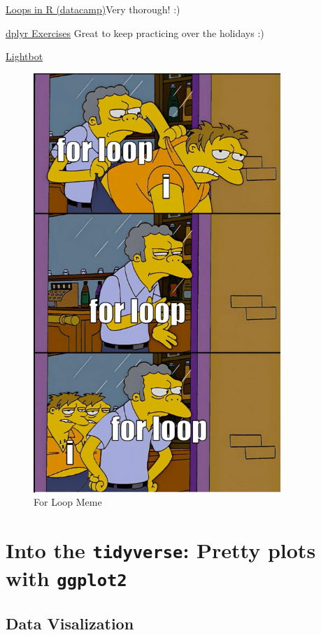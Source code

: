 \documentclass[
]{book}
\begin{document}
\href{https://www.datacamp.com/tutorial/tutorial-on-loops-in-r}{Loops in R (datacamp)}Very thorough! :)

\href{https://sjspielman.github.io/datascience_for_biologists/exercises/dplyr.html}{dplyr Exercises} Great to keep practicing over the holidays :)

\href{https://lightbot.com/hour-of-code.html}{Lightbot}

\begin{figure}
\centering
\includegraphics[width=\textwidth,height=6.25in]{./img/forbeep.png}
\caption{For Loop Meme}\label{id}
\end{figure}

\chapter{\texorpdfstring{Into the \texttt{tidyverse}: Pretty plots with \texttt{ggplot2}}{Into the tidyverse: Pretty plots with ggplot2}}\label{into-the-tidyverse-pretty-plots-with-ggplot2}

\section{\texorpdfstring{Data Visalization }{Data Visalization }}\label{data-visalization}
\end{document}
